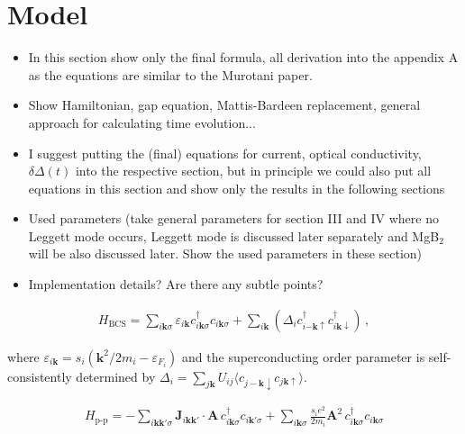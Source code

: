 \documentclass[aps,prb,reprint,noeprint,superscriptaddress]{revtex4-2}
\begin{document}
\section{Model}
\label{sec:model}

\begin{itemize}
	\item In this section show only the final formula, all derivation into the appendix A as the equations are similar to the Murotani paper.
	\item Show Hamiltonian, gap equation, Mattis-Bardeen replacement, general approach for calculating time evolution...
	\item I suggest putting the (final) equations for current, optical conductivity, $\delta\Delta(t)$ into the respective section, but in principle we could also put all equations in this section and show only the results in the following sections

	\item Used parameters (take general parameters for section III and IV where no Leggett mode occurs, Leggett mode is discussed later separately and MgB$_2$ will be also discussed later. Show the used parameters in these section)
	\item Implementation details? Are there any subtle points?
\end{itemize}


\begin{eqnarray}
	H_{\text{BCS}} = \sum_{i\mathbf{k}\sigma}  
	\varepsilon_{i\mathbf{k}}c_{i\mathbf{k}\sigma}^\dagger
	c_{i\mathbf{k}\sigma} + \sum_{i\mathbf{k}}^{}
	\left( \Delta_i c_{i\mathbf{-k}\uparrow }^\dagger
	c_{i\mathbf{k}\downarrow }^\dagger  \right) \,,
\end{eqnarray}

where $\varepsilon_{i\mathbf{k}} = s_i \left(\mathbf{k}^2/2m_i -
\varepsilon_{F_i}\right)$ and the superconducting order parameter is self-consistently determined by 
$\Delta_i = \sum_{j\mathbf{k}}^{}U_{ij} \langle c_{j-\mathbf{k}\downarrow
}c_{j\mathbf{k}\uparrow }\rangle$.

\begin{eqnarray*}
	H_{\text{p-p}} = -\sum_{i\mathbf{kk'}\sigma}^{}
	\mathbf{J}_{i\mathbf{kk'}} \cdot \mathbf{A} \,
	c_{i\mathbf{k}\sigma}^\dagger  c_{i\mathbf{k}'\sigma} +
	\sum_{i\mathbf{k}\sigma}^{} \frac{s_i e^2}{2m_i} \mathbf{A}^2 \,
	c_{i\mathbf{k}\sigma}^\dagger c_{i\mathbf{k}\sigma}
\end{eqnarray*}
\end{document}
